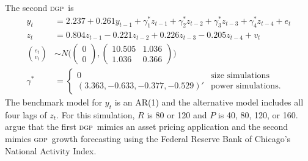 \documentclass[11pt,fleqn]{article}
\theoremstyle{definition}
\newcommand{\dgp}{\textsc{dgp}}
\newcommand{\gdp}{\textsc{gdp}}
\newcommand{\oos}{\textsc{oos}}
\begin{document}
\begin{table}[tb]
  \centering
  
  \caption{Size and power of the \oos\ tests under \eqref{eq:dgp1} at
    \testsize\% confidence.  These percentages are calculated from \totalsims\
    samples.  Pr[\textsc{cw}] shows the fraction of simulations for which Clark
    and West's (2007) statistic rejects; Pr[new] shows the fraction of
    simulations for which this paper's test rejects; and Pr[disagree]
    gives the fraction of simulations in which this paper's test and
    Clark and West's (2007) give different conclusions.}
\label{tab:mc1}
\end{table}

The second \dgp\ is
\begin{align*}
  y_{t} &= 2.237 + 0.261 y_{t-1} + \gamma^{*}_{1} z_{t-1} + \gamma_{2}^{*}
  z_{t-2} + \gamma_{3}^{*} z_{t-3} + \gamma_{4}^{*} z_{t-4} + e_{t} \\
  z_{t} &= 0.804 z_{t-1} - 0.221 z_{t-2} + 0.226 z_{t-3} - 0.205
  z_{t-4} + v_{t} \nonumber \\
  \binom{e_{t}}{v_{t}} &\sim N\Bigg(
  \begin{pmatrix}
    0 \\ 0
  \end{pmatrix},
  \begin{pmatrix}
    10.505 & 1.036 \\ 1.036 & 0.366
  \end{pmatrix}
  \Bigg) \nonumber\\\nonumber
  \gamma^{*} &=
  \begin{cases}
    0 & \text{size simulations}\\
    (3.363, -0.633, -0.377, -0.529)' & \text{power simulations}.
  \end{cases}
\end{align*}
The benchmark model for $y_{t}$ is an AR(1) and the alternative model
includes all four lags of $z_{t}$.  For this simulation, $R$ is 80 or
120 and $P$ is 40, 80, 120, or 160.  \citet{ClW:07} argue that the
first \dgp\ mimics an asset pricing application and the second mimics
\gdp\ growth forecasting using the Federal Reserve Bank of Chicago's
National Activity Index.

\begin{table}[tb]
  \centering
  
  \caption{Size and power of the \oos\ tests under \eqref{eq:dgp2} at
    \testsize\% confidence.  These percentages are calculated from \totalsims\
    samples.  Pr[\textsc{cw}] shows the fraction of simulations for which Clark
    and West's (2007) statistic rejects; Pr[new] shows the fraction of
    simulations for which this paper's test rejects; Pr[disagree] gives
    the fraction of simulations in which this paper's test and Clark and
    West's (2007) give different conclusions.}
\label{tab:mc2}
\end{table}
\end{document}
